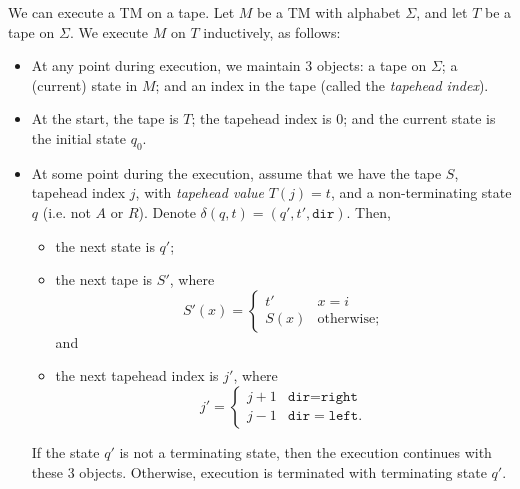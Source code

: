 We can execute a TM on a tape. Let $M$ be a TM with alphabet $\Sigma$, and let $T$ be a tape on $\Sigma$. We execute $M$ on $T$ inductively, as follows:
\begin{itemize}
    \item At any point during execution, we maintain 3 objects: a tape on $\Sigma$; a (current) state in $M$; and an index in the tape (called the \emph{tapehead index}).  

    \item At the start, the tape is $T$; the tapehead index is $0$; and the current state is the initial state $q_0$. 
    
    \item At some point during the execution, assume that we have the tape $S$, tapehead index $j$, with \emph{tapehead value} $T(j) = t$, and a non-terminating state $q$ (i.e. not $A$ or $R$). Denote $\delta(q, t) = (q', t', \texttt{dir})$. Then, 
    \begin{itemize}
        \item the next state is $q'$;
        \item the next tape is $S'$, where
        \[S'(x) = \begin{cases}
            t' & x = i \\
            S(x) & \text{otherwise};
        \end{cases}\]
        and
        \item the next tapehead index is $j'$, where
        \[j' = \begin{cases}
            j+1 & \texttt{dir} = \texttt{right} \\
            j-1 & \texttt{dir} = \texttt{left}.
        \end{cases}\]
    \end{itemize}
    If the state $q'$ is not a terminating state, then the execution continues with these 3 objects. Otherwise, execution is terminated with terminating state $q'$.
\end{itemize}

